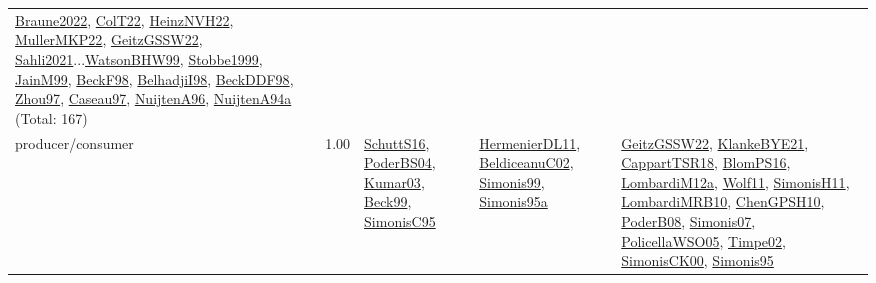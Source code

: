 {\begin{longtable}{p{3cm}r>{\raggedright\arraybackslash}p{6cm}>{\raggedright\arraybackslash}p{6cm}>{\raggedright\arraybackslash}p{8cm}}
\hyperref[detail:Braune2022]{Braune2022}, \hyperref[detail:ColT22]{ColT22}, \hyperref[detail:HeinzNVH22]{HeinzNVH22}, \hyperref[detail:MullerMKP22]{MullerMKP22}, \hyperref[detail:GeitzGSSW22]{GeitzGSSW22}, \hyperref[detail:Sahli2021]{Sahli2021}...\hyperref[detail:WatsonBHW99]{WatsonBHW99}, \hyperref[detail:Stobbe1999]{Stobbe1999}, \hyperref[detail:JainM99]{JainM99}, \hyperref[detail:BeckF98]{BeckF98}, \hyperref[detail:BelhadjiI98]{BelhadjiI98}, \hyperref[detail:BeckDDF98]{BeckDDF98}, \hyperref[detail:Zhou97]{Zhou97}, \hyperref[detail:Caseau97]{Caseau97}, \hyperref[detail:NuijtenA96]{NuijtenA96}, \hyperref[detail:NuijtenA94a]{NuijtenA94a} (Total: 167)\\
\index{producer/consumer}\index{Concepts!producer/consumer}producer/consumer &  1.00 & \hyperref[detail:SchuttS16]{SchuttS16}, \hyperref[detail:PoderBS04]{PoderBS04}, \hyperref[detail:Kumar03]{Kumar03}, \hyperref[detail:Beck99]{Beck99}, \hyperref[detail:SimonisC95]{SimonisC95} & \hyperref[detail:HermenierDL11]{HermenierDL11}, \hyperref[detail:BeldiceanuC02]{BeldiceanuC02}, \hyperref[detail:Simonis99]{Simonis99}, \hyperref[detail:Simonis95a]{Simonis95a} & \hyperref[detail:GeitzGSSW22]{GeitzGSSW22}, \hyperref[detail:KlankeBYE21]{KlankeBYE21}, \hyperref[detail:CappartTSR18]{CappartTSR18}, \hyperref[detail:BlomPS16]{BlomPS16}, \hyperref[detail:LombardiM12a]{LombardiM12a}, \hyperref[detail:Wolf11]{Wolf11}, \hyperref[detail:SimonisH11]{SimonisH11}, \hyperref[detail:LombardiMRB10]{LombardiMRB10}, \hyperref[detail:ChenGPSH10]{ChenGPSH10}, \hyperref[detail:PoderB08]{PoderB08}, \hyperref[detail:Simonis07]{Simonis07}, \hyperref[detail:PolicellaWSO05]{PolicellaWSO05}, \hyperref[detail:Timpe02]{Timpe02}, \hyperref[detail:SimonisCK00]{SimonisCK00}, \hyperref[detail:Simonis95]{Simonis95}\\

\end{longtable}}
